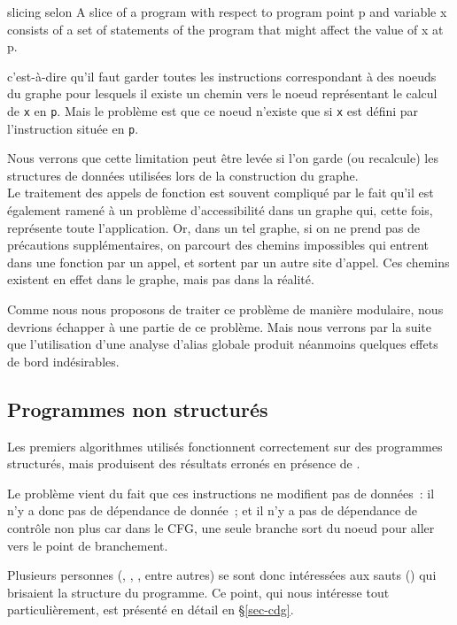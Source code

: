 \begin{definition}{slicing selon \cite{horwitz88interprocedural}}
A slice of a program with respect to program point p and variable x
consists of a set of statements of the program that might affect
the value of x at p.
\end{definition}

c'est-à-dire qu'il faut garder toutes les instructions correspondant à des
noeuds du graphe pour lesquels il existe un chemin vers le noeud représentant le
calcul de {\tt x} en {\tt p}.
Mais le problème est que ce noeud n'existe que si {\tt x} est défini
par l'instruction située en {\tt p}.

Nous verrons que cette limitation peut être levée si l'on garde
(ou recalcule) les structures de données utilisées
lors de la construction du graphe.\\

Le traitement des appels de fonction est souvent compliqué par le fait qu'il
est également ramené à un problème d'accessibilité dans un graphe qui,
cette fois, représente toute l'application. Or, dans un tel graphe,
si on ne prend pas de précautions supplémentaires,
on parcourt des chemins impossibles qui entrent dans une fonction
par un appel, et sortent par un autre site d'appel.
Ces chemins existent en effet dans le graphe,
mais pas dans la réalité.

Comme nous nous proposons de traiter ce problème de manière modulaire,
nous devrions échapper à une partie de ce problème.
Mais nous verrons par la suite que l'utilisation d'une analyse d'alias globale
produit néanmoins quelques effets de bord indésirables.

\subsection{Programmes non structurés}

Les premiers algorithmes utilisés fonctionnent
correctement sur des programmes structurés,
mais produisent des résultats erronés en présence de .

Le problème vient du fait que ces instructions ne modifient pas de données~:
il n'y a donc pas de dépendance de donnée~; et il n'y a pas
de dépendance de contrôle non plus car dans le CFG,
une seule branche sort du noeud pour aller vers le point de branchement.

Plusieurs personnes (\cite{Choi94},  \cite{agrawal94slicing},
\cite{harman98new},  \cite{kumar02better} entre autres)
se sont donc intéressées
aux sauts () qui brisaient la structure du programme.
Ce point, qui nous intéresse tout particulièrement, est présenté en détail
en \S\ref{sec-cdg}.

